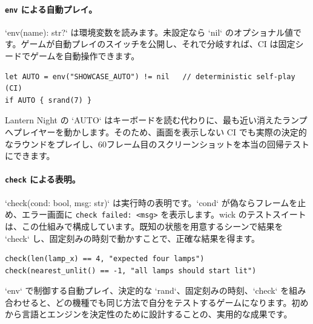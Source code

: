 \paragraph{\texttt{env} による自動プレイ。} `env(name): str?` は環境変数を読みます。未設定なら `nil` のオプショナル値です。ゲームが自動プレイのスイッチを公開し、それで分岐すれば、CI は固定シードでゲームを自動操作できます。

\begin{lstlisting}[language=wick]
let AUTO = env("SHOWCASE_AUTO") != nil   // deterministic self-play (CI)
if AUTO { srand(7) }
\end{lstlisting}

\noindent
Lantern Night の `AUTO` はキーボードを読む代わりに、最も近い消えたランプへプレイヤーを動かします。そのため、画面を表示しない CI でも実際の決定的なラウンドをプレイし、60フレーム目のスクリーンショットを本当の回帰テストにできます。

\paragraph{\texttt{check} による表明。} `check(cond: bool, msg: str)` は実行時の表明です。`cond` が偽ならフレームを止め、エラー画面に \texttt{check failed: <msg>} を表示します。wick のテストスイートは、この仕組みで構成しています。既知の状態を用意するシーンで結果を `check` し、固定刻みの時刻で動かすことで、正確な結果を得ます。

\begin{lstlisting}[language=wick]
check(len(lamp_x) == 4, "expected four lamps")
check(nearest_unlit() == -1, "all lamps should start lit")
\end{lstlisting}

\noindent
`env` で制御する自動プレイ、決定的な `rand`、固定刻みの時刻、`check` を組み合わせると、どの機種でも同じ方法で自分をテストするゲームになります。初めから言語とエンジンを決定性のために設計することの、実用的な成果です。
